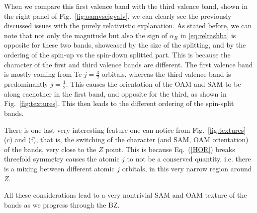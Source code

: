 When we compare this first valence band with the third valence band, shown in the right panel of Fig.~\ref{fig:oamvseigvalv}, we can clearly see the previously discussed issues with the purely relativistic explanation. As stated before, we can note that not only the magnitude but also the sign of $\alpha_R$ in \ref{eq:relrashba} is opposite for these two bands, showcased by the size of the splitting, and by the ordering of the spin-up vs the spin-down splitted part. This is because the character of the first and third valence bands are different. The first valence band is mostly coming from Te $j=\frac{3}{2}$ orbitals, whereas the third valence band is predominantly $j=\frac{1}{2}$. This causes the orientation of the OAM and SAM to be along eachother in the first band, and opposite for the third, as shown in Fig.~\ref{fig:textures}. This then leads to the different ordering of the spin-split bands.

There is one last very interesting feature one can notice from Fig.~\ref{fig:textures} (c) and (f), that is, the switching of the character (and SAM, OAM orientation) of the bands, very close to the $Z$ point. This is because Eq.~(\ref{HOR}) breaks threefold symmetry causes the atomic $j$ to not be a conserved quantity, i.e. there is a mixing between different atomic $j$ orbitals, in this very narrow region around $Z$.

All these considerations lead to a very nontrivial SAM and OAM texture of the bands as we progress through the BZ.


